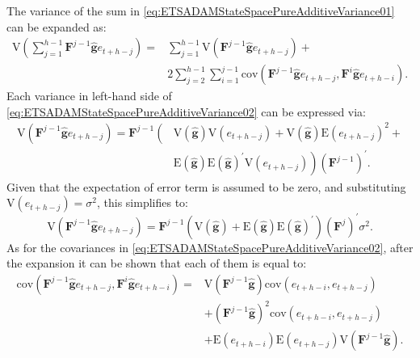 \documentclass[]{book}
\theoremstyle{definition}
\theoremstyle{definition}
\theoremstyle{definition}
\theoremstyle{definition}
\theoremstyle{remark}
\begin{document}
The variance of the sum in \eqref{eq:ETSADAMStateSpacePureAdditiveVariance01} can be expanded as:
\begin{equation}
    \begin{aligned}
    \mathrm{V} \left(\sum_{j=1}^{h-1} \mathbf{F}^{j-1} \hat{\mathbf{g}} e_{t+h-j} \right) = & \sum_{j=1}^{h-1} \mathrm{V} \left(\mathbf{F}^{j-1} \hat{\mathbf{g}} e_{t+h-j}\right) + \\
    & 2 \sum_{j=2}^{h-1} \sum_{i=1}^{j-1} \mathrm{cov}(\mathbf{F}^{j-1} \hat{\mathbf{g}} e_{t+h-j},\mathbf{F}^{i} \hat{\mathbf{g}} e_{t+h-i}).
    \end{aligned}
  \label{eq:ETSADAMStateSpacePureAdditiveVariance02}
\end{equation}
Each variance in left-hand side of \eqref{eq:ETSADAMStateSpacePureAdditiveVariance02} can be expressed via:
\begin{equation}
    \begin{aligned}
    \mathrm{V} \left(\mathbf{F}^{j-1} \hat{\mathbf{g}} e_{t+h-j}\right) = \mathbf{F}^{j-1} \left( \right. & \mathrm{V} (\hat{\mathbf{g}}) \mathrm{V}(e_{t+h-j}) + \mathrm{V} (\hat{\mathbf{g}}) \mathrm{E}(e_{t+h-j})^2 + \\
    & \left. \mathrm{E} (\hat{\mathbf{g}}) \mathrm{E} (\hat{\mathbf{g}})^\prime \mathrm{V}(e_{t+h-j})\right) (\mathbf{F}^{j-1})^\prime.
    \end{aligned}
  \label{eq:ETSADAMStateSpacePureAdditiveVariance03}
\end{equation}
Given that the expectation of error term is assumed to be zero, and substituting \(\mathrm{V}(e_{t+h-j})=\sigma^2\), this simplifies to:
\begin{equation}
    \mathrm{V} \left(\mathbf{F}^{j-1} \hat{\mathbf{g}} e_{t+h-j}\right) = \mathbf{F}^{j-1} \left( \mathrm{V} (\hat{\mathbf{g}}) + \mathrm{E} (\hat{\mathbf{g}}) \mathrm{E} (\hat{\mathbf{g}})^\prime \right) (\mathbf{F}^{j})^\prime \sigma^2.
  \label{eq:ETSADAMStateSpacePureAdditiveVariance04}
\end{equation}
As for the covariances in \eqref{eq:ETSADAMStateSpacePureAdditiveVariance02}, after the expansion it can be shown that each of them is equal to:
\begin{equation}
    \begin{aligned}
    \mathrm{cov}(\mathbf{F}^{j-1} \hat{\mathbf{g}} e_{t+h-j},\mathbf{F}^{i} \hat{\mathbf{g}} e_{t+h-i}) = & \mathrm{V}(\mathbf{F}^{j-1} \hat{\mathbf{g}}) \mathrm{cov}(e_{t+h-i},e_{t+h-j}) \\
     & + \left(\mathbf{F}^{j-1} \hat{\mathbf{g}}\right)^2 \mathrm{cov}(e_{t+h-i},e_{t+h-j}) \\
    & + \mathrm{E}(e_{t+h-i}) \mathrm{E}(e_{t+h-j}) \mathrm{V}(\mathbf{F}^{j-1} \hat{\mathbf{g}}).
    \end{aligned}
  \label{eq:ETSADAMStateSpacePureAdditiveVariance05}
\end{equation}
\end{document}
